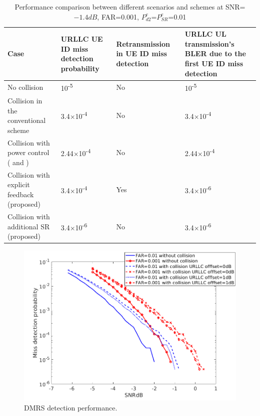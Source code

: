 \documentclass[conference]{IEEEtran}
\begin{document}
\begin{table}[htbp]
\caption{Performance comparison between different scenarios and schemes at SNR=$-1.4dB$, FAR=0.001, $P^{e}_{d2}$=$P^{e}_{SR}$=0.01}
\begin{center}
\begin{tabular}{|p{19em}|p{9em}|p{10em}|p{12em}|}
 \hline
 \textbf{Case} & \textbf{URLLC UE ID miss detection probability}& \textbf{Retransmission in UE ID miss detection}& \textbf{URLLC UL transmission's BLER due to the first UE ID miss detection}\\
 \hline
 No collision  & 10\textsuperscript{-5}&No&10\textsuperscript{-5}\\
 \hline
 Collision in the conventional scheme& 3.4$\times$10\textsuperscript{-4}&No&3.4$\times$10\textsuperscript{-4}\\
 \hline
 Collision with power control (\cite{b2} and \cite{b3})&2.44$\times$10\textsuperscript{-4}&No&2.44$\times$10\textsuperscript{-4}\\
 \hline
 Collision with explicit feedback (proposed)& 3.4$\times$10\textsuperscript{-4}&Yes&3.4$\times$10\textsuperscript{-6}\\
\hline
 Collision with additional SR (proposed)& 3.4$\times$10\textsuperscript{-6}&No&3.4$\times$10\textsuperscript{-6}\\

 
 \hline
\end{tabular}
\label{tab2}
\end{center}
\vspace{-6mm}
\end{table}

\begin{figure}[htbp]
\centerline{\includegraphics[scale=0.33]{fig5.png}}
\caption{DMRS detection performance.}
\label{fig5}
\vspace{-3mm}
\end{figure}
\end{document}
